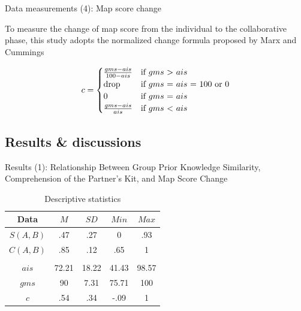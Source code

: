 \begin{frame}{Data measurements (4): Map score change}

To measure the change of map score from the individual to the collaborative phase, this 
study adopts the normalized change formula proposed by Marx and Cummings 


\begin{equation}
 c =
    \begin{cases}
        \frac{gms - ais}{100 - ais} & \text{if $gms$ > $ais$}\\
        $drop$ & \text{if $gms$ = $ais$ = 100 or 0} \\
        0 & \text{if $gms$ = $ais$}\\
        \frac{gms - ais}{ais} & \text{if $gms$ < $ais$}
    \end{cases}
    \label{eq:7}
\end{equation}
    
\end{frame}


\subsection{Results \& discussions}
\begin{frame}{Results (1): Relationship Between Group Prior Knowledge Similarity, 
   Comprehension of the Partner’s Kit, and Map Score Change}

\begin{table}[tb]
    \caption{Descriptive statistics}
    \label{desc_stat}
    \begin{center}
        \begin{tabular}{c|c|c|c|c}
            \hline
            Data & $M$ & $SD$ & $Min$ & $Max$\\
            \hline
            $S(A, B)$ & .47 & .27 & 0 & .93 \\
            $C(A, B)$ & .85 & .12 & .65 & 1 \\
            & & & &\\
            $ais$ & 72.21 & 18.22 & 41.43 & 98.57 \\
            $gms$ & 90 & 7.31 & 75.71 & 100 \\
            $c$ & .54 & .34 & -.09 & 1 \\
            \hline
        \end{tabular}
    \end{center}
\end{table}
\end{frame}


